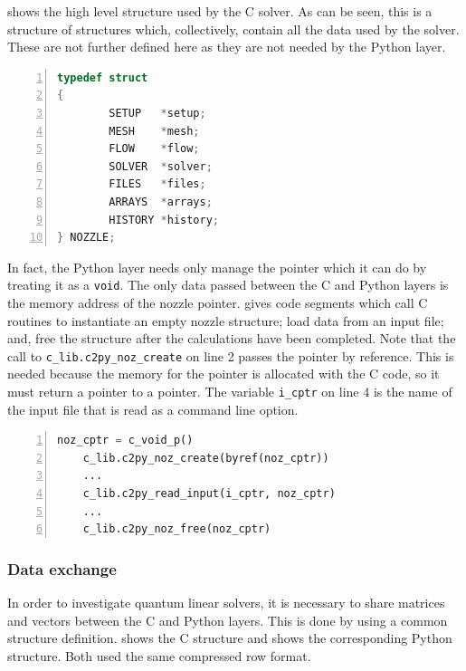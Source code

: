  shows the high level structure used by the C solver.
As can be seen, this is a structure of structures which, collectively, contain all the
data used by the solver. These are not further defined here as they are not needed by
the Python layer.

\begin{lstlisting}[numbers=left, language=C, caption=C master structure for nozzle data, label=list-noz-cstruct]
typedef struct
{
        SETUP   *setup;
        MESH    *mesh;
        FLOW    *flow;
        SOLVER  *solver;
        FILES   *files;
        ARRAYS  *arrays;
        HISTORY *history;
} NOZZLE;
\end{lstlisting}

In fact, the Python layer needs only manage the pointer which it can do by treating it
as a {\tt void}. The only data passed between the C and Python layers is the memory address of
the nozzle pointer.
 gives code segments which call C routines to instantiate an empty nozzle structure;
load data from an input file; and, free the structure after the calculations have been completed.
Note that the call to {\tt c\_lib.c2py\_noz\_create} on line 2 passes the pointer by reference. 
This is needed because the memory for the pointer is allocated with the C code, so it must return
a pointer to a pointer.
The variable {\tt i\_cptr} on line 4 is the name of the input file that is read as a command 
line option.


\begin{lstlisting}[numbers=left, language=Python, caption=Python instantiation., label=list-noz-pyinst]
    noz_cptr = c_void_p()
    c_lib.c2py_noz_create(byref(noz_cptr))
    ...
    c_lib.c2py_read_input(i_cptr, noz_cptr)
    ...
    c_lib.c2py_noz_free(noz_cptr)
\end{lstlisting}

%
\subsubsection{Data exchange}
\label{subsubsec-data-exch}

In order to investigate quantum linear solvers, it is necessary to share matrices and vectors
between the C and Python layers. This is done by using a common structure definition.
 shows the C structure and  shows the
corresponding Python structure. Both used the same compressed row format.


